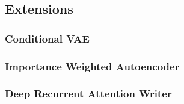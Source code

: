 \subsection{Extensions}
\label{sub:vae_extensions}

\subsubsection{Conditional VAE \cite{cvae:2015}}
\label{ssub:vae_conditional_vae}


\subsubsection{Importance Weighted Autoencoder \cite{iwae:2015}}
\label{ssub:vae_importance_weighted_autoencoder}


\subsubsection{Deep Recurrent Attention Writer \cite{draw:2015}}
\label{ssub:vae_deep_recurrent_attention_writer}


